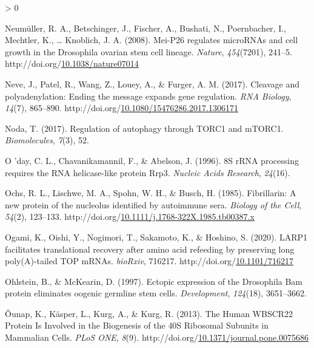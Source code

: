 \documentclass[12pt,oneside]{reedthesis}
\newlength{\cslhangindent}
\newenvironment{CSLReferences}[2] %
 {%
  \setlength{\parindent}{0pt}
  \ifodd #1 \everypar{\setlength{\hangindent}{\cslhangindent}}\ignorespaces\fi
  \ifnum #2 > 0
  \setlength{\parskip}{#2\baselineskip}
  \fi
 }%
 {}
\begin{document}
\begin{CSLReferences}{1}{0}
\leavevmode\hypertarget{ref-Neumuller2008}{}%
Neumüller, R. A., Betschinger, J., Fischer, A., Bushati, N., Poernbacher, I., Mechtler, K., \ldots{} Knoblich, J. A. (2008). Mei-{P26} regulates {microRNAs} and cell growth in the {Drosophila} ovarian stem cell lineage. \emph{Nature}, \emph{454}(7201), 241--5. http://doi.org/\href{https://doi.org/10.1038/nature07014}{10.1038/nature07014}

\leavevmode\hypertarget{ref-Neve2017i}{}%
Neve, J., Patel, R., Wang, Z., Louey, A., \& Furger, A. M. (2017). Cleavage and polyadenylation: {Ending} the message expands gene regulation. \emph{RNA Biology}, \emph{14}(7), 865--890. http://doi.org/\href{https://doi.org/10.1080/15476286.2017.1306171}{10.1080/15476286.2017.1306171}

\leavevmode\hypertarget{ref-Noda2017}{}%
Noda, T. (2017). Regulation of autophagy through {TORC1} and {mTORC1}. \emph{Biomolecules}, \emph{7}(3), 52.

\leavevmode\hypertarget{ref-oday8SRRNAProcessing1996}{}%
O 'day, C. L., Chavanikamannil, F., \& Abelson, J. (1996). {8S rRNA} processing requires the {RNA} helicase-like protein {Rrp3}. \emph{Nucleic Acids Research}, \emph{24}(16).

\leavevmode\hypertarget{ref-ochsFibrillarinNewProtein1985}{}%
Ochs, R. L., Lischwe, M. A., Spohn, W. H., \& Busch, H. (1985). Fibrillarin: A new protein of the nucleolus identified by autoimmune sera. \emph{Biology of the Cell}, \emph{54}(2), 123--133. http://doi.org/\href{https://doi.org/10.1111/j.1768-322X.1985.tb00387.x}{10.1111/j.1768-322X.1985.tb00387.x}

\leavevmode\hypertarget{ref-ogamiLARP1FacilitatesTranslational2020}{}%
Ogami, K., Oishi, Y., Nogimori, T., Sakamoto, K., \& Hoshino, S. (2020). {LARP1} facilitates translational recovery after amino acid refeeding by preserving long poly({A})-tailed {TOP mRNAs}. \emph{bioRxiv}, 716217. http://doi.org/\href{https://doi.org/10.1101/716217}{10.1101/716217}

\leavevmode\hypertarget{ref-ohlsteinEctopicExpressionDrosophila1997}{}%
Ohlstein, B., \& McKearin, D. (1997). Ectopic expression of the {Drosophila Bam} protein eliminates oogenic germline stem cells. \emph{Development}, \emph{124}(18), 3651--3662.

\leavevmode\hypertarget{ref-ounapHumanWBSCR22Protein2013}{}%
Õunap, K., Käsper, L., Kurg, A., \& Kurg, R. (2013). The {Human WBSCR22 Protein Is Involved} in the {Biogenesis} of the {40S Ribosomal Subunits} in {Mammalian Cells}. \emph{PLoS ONE}, \emph{8}(9). http://doi.org/\href{https://doi.org/10.1371/journal.pone.0075686}{10.1371/journal.pone.0075686}


\end{CSLReferences}
\end{document}
